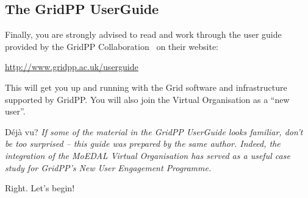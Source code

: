 \subsection{The GridPP UserGuide}
\label{sec:gridppuserguide}
Finally, you are strongly advised to read and work through the
user guide provided by the GridPP Collaboration~\cite{gridpp2006,gridpp2009}
on their website:

\href{http://www.gridpp.ac.uk/userguide}{http://www.gridpp.ac.uk/userguide}

This will get you up and running with the Grid software and
infrastructure supported by GridPP. You will also join the
 Virtual Organisation as a ``new user''.

\begin{infobox}{D\'ej\`a vu?}
{\em If some of the material in the GridPP UserGuide looks familiar,
don't be too surprised -- this guide was prepared by the same
author. Indeed, the integration of the MoEDAL Virtual Organisation
has served as a useful case study for GridPP's
New User Engagement Programme.}
\end{infobox}

Right. Let's begin!
